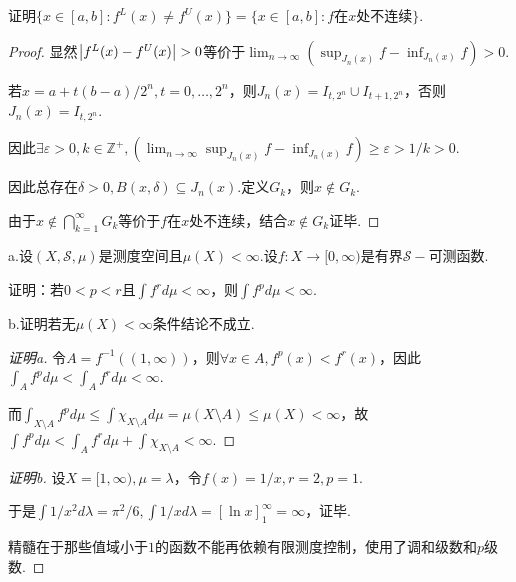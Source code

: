 \newpage

\begin{problem}[8]\label{3.B.8}
    证明\(\{x \in [a,b]: f^L(x) \ne f^U(x)\}=\{x \in [a,b]: f \text{在} x \text{处不连续}\}\).
\end{problem}

\begin{proof}
    显然\(\abs*{f^L(x)-f^U(x)}>0\)等价于\(\lim_{n \to \infty}(\sup_{J_n(x)} f-\inf_{J_n(x)} f)>0\).

    若\(x=a+t(b-a)/2^n, t=0, \dots, 2^n\)，则\(J_n(x)=I_{t,2^n} \cup I_{t+1,2^n}\)，否则\(J_n(x)=I_{t,2^n}\).

    因此\(\exists \varepsilon>0, k \in \mathbb{Z}^+, (\lim_{n \to \infty} \sup_{J_n(x)} f-\inf_{J_n(x)} f) \geq \varepsilon>1/k>0\).

    因此总存在\(\delta>0, B(x,\delta) \subseteq J_n(x)\).定义\(G_k\)，则\(x \notin G_k\).

    由于\(x \notin \bigcap_{k=1}^\infty G_k\)等价于\(f\)在\(x\)处不连续，结合\(x \notin G_k\)证毕.
\end{proof}

\begin{problem}[10]\label{3.B.10}
    a.设\((X, \mathcal{S}, \mu)\)是测度空间且\(\mu(X)<\infty\).设\(f: X \to [0,\infty)\)是有界\(\mathcal{S}-\)可测函数.

    证明：若\(0<p<r\)且\(\int f^r d\mu<\infty\)，则\(\int f^p d\mu<\infty\).

    b.证明若无\(\mu(X)<\infty\)条件结论不成立.
\end{problem}

\begin{proof}[证明a]
    令\(A=f^{-1}((1,\infty))\)，则\(\forall x \in A, f^p(x)<f^r(x)\)，因此\(\int_A f^p d\mu<\int_A f^r d\mu<\infty\).

    而\(\int_{X \setminus A} f^p d\mu \leq \int \chi_{X \setminus A} d\mu=\mu(X \setminus A) \leq \mu(X)<\infty\)，故\(\int f^p d\mu<\int_A f^r d\mu+\int \chi_{X \setminus A}<\infty\).
\end{proof}

\begin{proof}[证明b]
    设\(X=[1,\infty), \mu=\lambda\)，令\(f(x)=1/x, r=2, p=1\).

    于是\(\int 1/x^2 d\lambda=\pi^2/6, \int 1/x d\lambda=[\ln x]_1^\infty=\infty\)，证毕.

    {\kaishu 精髓在于那些值域小于\(1\)的函数不能再依赖有限测度控制，使用了调和级数和\(p\)级数.}
\end{proof}

